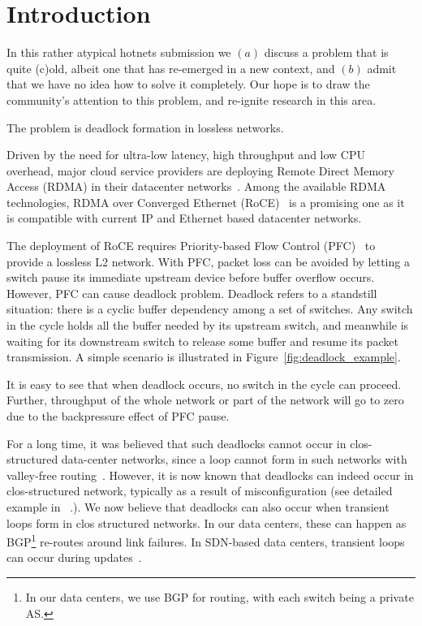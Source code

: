 \secspace
\section{Introduction}
\secspace
\label{sec:intro}

In this rather atypical hotnets submission we $(a)$ discuss a problem that is
quite (c)old, albeit one that has re-emerged in a new context, and $(b)$ admit
that we have no idea how to solve it completely. Our hope is to draw the
community's attention to this problem, and re-ignite research in this area.

The problem is deadlock formation in lossless networks.

Driven by the need for ultra-low latency, high throughput and low CPU overhead,
major cloud service providers are deploying Remote Direct Memory Access (RDMA) in
their datacenter networks~\cite{dcqcn,timely}. Among the
available RDMA technologies,  RDMA over Converged Ethernet (RoCE)~\cite{roce} is
a promising one as it is compatible with current IP and Ethernet based
datacenter networks.

The deployment of RoCE requires Priority-based Flow Control (PFC)~\cite{pfc} to
provide a lossless L2 network. With PFC, packet loss can be avoided by letting a
switch pause its immediate upstream device before buffer overflow occurs.
However, PFC can cause deadlock problem. Deadlock refers to a
standstill situation: there is a cyclic buffer dependency among a set of
switches. Any switch in the cycle holds all the buffer needed by its upstream
switch, and meanwhile is waiting for its downstream switch to release some
buffer and resume its packet transmission. A simple scenario is illustrated in
Figure~\ref{fig:deadlock_example}.

It is easy to see that when deadlock occurs, no switch in the cycle can proceed.
Further, throughput of the whole network or part of the network will go to zero
due to the backpressure effect of PFC pause. 

For a long time, it was believed that such deadlocks cannot occur in
clos-structured data-center networks, since a loop cannot form in such networks
with valley-free routing~\cite{dcqcn}.  However, it is now known that deadlocks
can indeed occur in clos-structured network, typically as a result of
misconfiguration (see detailed example in ~\cite{rdmascale}.). We now believe
that deadlocks can also occur when transient loops form in clos structured
networks. In our data centers, these can happen as BGP\footnote{In our data
centers, we use BGP for routing, with each switch being a private AS.} re-routes
around link failures. In SDN-based data centers, transient loops can occur
during updates~\cite{dionysus}.

